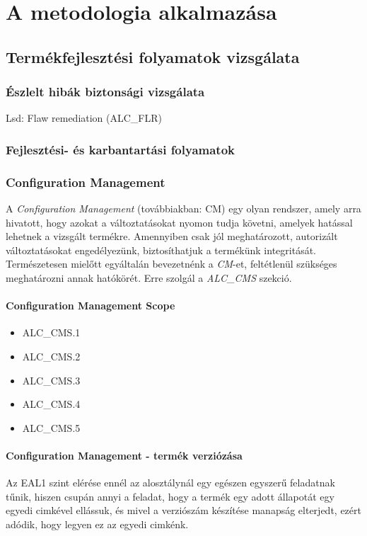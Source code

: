 \chapter{A metodologia alkalmazása}

\section{Termékfejlesztési folyamatok vizsgálata}
\subsection{Észlelt hibák biztonsági vizsgálata}

Lsd: Flaw remediation (ALC\_FLR)

\subsection{Fejlesztési- és karbantartási folyamatok}

\subsection{Configuration Management}
A \emph{Configuration Management} (továbbiakban: CM) egy olyan rendszer, amely arra hivatott,
hogy azokat a változtatásokat nyomon tudja követni, amelyek hatással lehetnek a vizsgált termékre.
Amennyiben csak jól meghatározott, autorizált változtatásokat engedélyezünk, biztosíthatjuk a
termékünk integritását.
Természetesen mielőtt egyáltalán bevezetnénk a \emph{CM}-et, feltétlenül szükséges meghatározni
annak hatókörét. Erre szolgál a \emph{ALC\_CMS} szekció.

\subsubsection{Configuration Management Scope}
\begin{itemize}
    \item{ALC\_CMS.1}
    \item{ALC\_CMS.2}
    \item{ALC\_CMS.3}
    \item{ALC\_CMS.4}
    \item{ALC\_CMS.5}
\end{itemize}

\subsubsection{Configuration Management - termék verziózása}
Az EAL1 szint elérése ennél az alosztálynál egy egészen egyszerű feladatnak tűnik, hiszen csupán
annyi a feladat, hogy a termék egy adott állapotát egy egyedi cimkével ellássuk, és mivel a
verziószám készítése manapság elterjedt, ezért adódik, hogy legyen ez az egyedi cimkénk.

